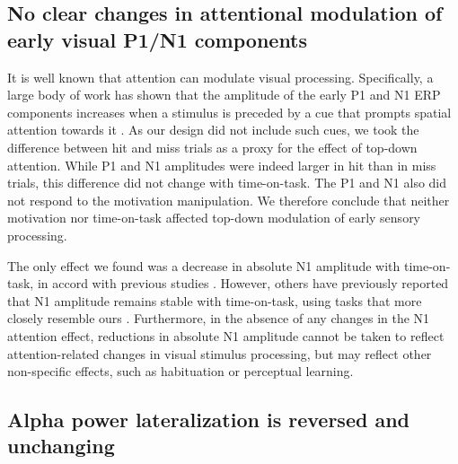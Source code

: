 \documentclass[11pt,english,]{memoir}
\begin{document}
\hypertarget{no-clear-changes-in-attentional-modulation-of-early-visual-p1n1-components}{%
\subsection{No clear changes in attentional modulation of early visual P1/N1 components}\label{no-clear-changes-in-attentional-modulation-of-early-visual-p1n1-components}}

It is well known that attention can modulate visual processing. Specifically, a large body of work has shown that the amplitude of the early P1 and N1 ERP components increases when a stimulus is preceded by a cue that prompts spatial attention towards it \autocite{Luck1994}. As our design did not include such cues, we took the difference between hit and miss trials as a proxy for the effect of top-down attention. While P1 and N1 amplitudes were indeed larger in hit than in miss trials, this difference did not change with time-on-task. The P1 and N1 also did not respond to the motivation manipulation. We therefore conclude that neither motivation nor time-on-task affected top-down modulation of early sensory processing.

The only effect we found was a decrease in absolute N1 amplitude with time-on-task, in accord with previous studies \autocites{Boksem2005}{Faber2012}. However, others have previously reported that N1 amplitude remains stable with time-on-task, using tasks that more closely resemble ours \autocites{Koelega1992}{Bonnefond2010}. Furthermore, in the absence of any changes in the N1 attention effect, reductions in absolute N1 amplitude cannot be taken to reflect attention-related changes in visual stimulus processing, but may reflect other non-specific effects, such as habituation or perceptual learning.

\hypertarget{alpha-power-lateralization-is-reversed-and-unchanging}{%
\subsection{Alpha power lateralization is reversed and unchanging}\label{alpha-power-lateralization-is-reversed-and-unchanging}}
\end{document}
